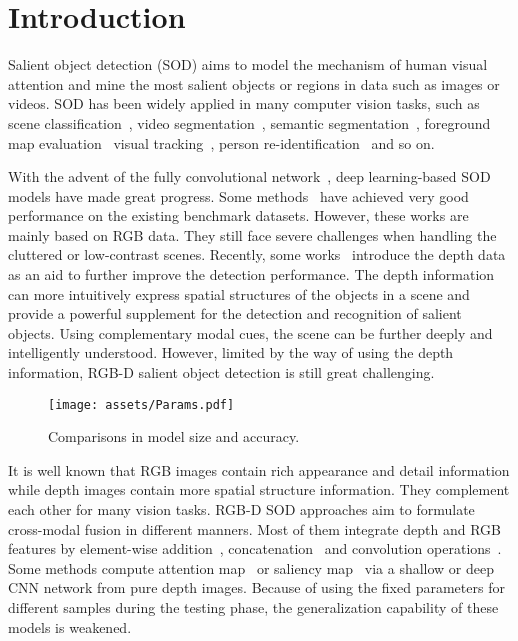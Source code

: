 \documentclass[runningheads]{llncs}
\begin{document}
\section{Introduction}

Salient object detection (SOD) aims to model the mechanism of human visual attention and mine the most salient objects or regions in data such as images or videos. SOD has been widely applied in many computer vision tasks, such as scene classification~\cite{sceneclassification}, video segmentation~\cite{VideoSaliencyFDP}, semantic segmentation~\cite{WSSemanticSegmentation}, foreground map evaluation~\cite{Smeasure,Emeasure} visual tracking~\cite{tracking}, person re-identification~\cite{Reid} and so on.

With the advent of the fully convolutional network~\cite{FCN}, deep learning-based SOD models \cite{DSS,PiCANet} have made great progress. Some methods~\cite{EGNet,MINet,F3Net,GateNet} have achieved very good performance on the existing benchmark datasets. However, these works are mainly based on RGB data.  They still face severe challenges when handling the cluttered or low-contrast scenes.
Recently, some works~\cite{DES,DCMC,CDCP,DF,CTMF,PCANet,MMCI} introduce the depth data as an aid to further improve the detection performance.
The depth information can more intuitively express spatial structures of the objects in a scene and provide a powerful supplement for the detection and recognition of salient objects. Using complementary modal cues, the scene can be further deeply and intelligently understood. However, limited by the way of using the depth information, RGB-D salient object detection is still great challenging.

\begin{figure*}[t]
 \begin{center}
  \texttt{[image: assets/Params.pdf]}
  \caption{Comparisons in model size and accuracy.}
  \label{fig:CompParams}
 \end{center}
\end{figure*}

It is well known that RGB images contain rich appearance and detail information while depth images contain more spatial structure information. They complement each other for many vision tasks.  RGB-D SOD approaches aim to formulate cross-modal fusion in different manners. Most of them integrate depth and RGB features by element-wise addition~\cite{MMCI,DUTRGBD}, concatenation~\cite{SIP,TANet} and convolution operations~\cite{PCANet,AFNetRGBD}.
Some methods compute attention map~\cite{CPFP} or saliency map~\cite{AFNetRGBD} via a shallow or deep CNN network from pure depth images. Because of using the fixed parameters for different samples during the testing phase, the generalization capability of these models is weakened.
\end{document}
